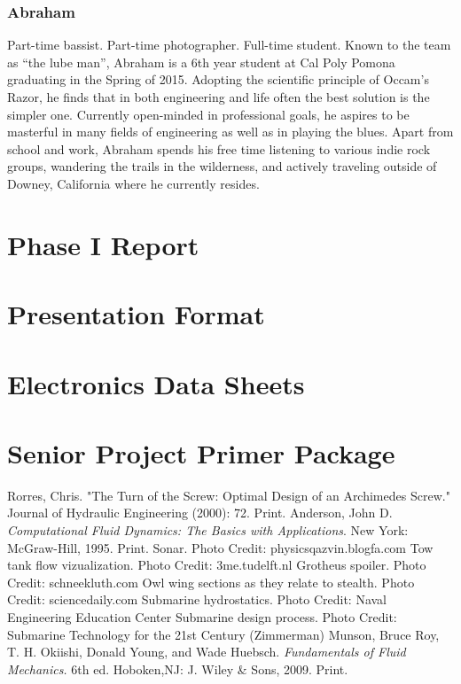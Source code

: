 \documentclass{report}
\begin{document}
\subsection{Abraham}
Part-time bassist.  Part-time photographer.  Full-time student.  Known to the team as “the lube man”, Abraham is a 6th year student at Cal Poly Pomona graduating in the Spring of 2015.  Adopting the scientific principle of Occam’s Razor, he finds that in both engineering and life often the best solution is the simpler one.  Currently open-minded in professional goals, he aspires to be masterful in many fields of engineering as well as in playing the blues.  Apart from school and work, Abraham spends his free time listening to various indie rock groups, wandering the trails in the wilderness, and actively traveling outside of Downey, California where he currently resides.
\appendix
\chapter{Phase I Report}

\chapter{Presentation Format}
\chapter{Electronics Data Sheets}

\chapter{Senior Project Primer Package}

\begin{thebibliography}{9}
Rorres, Chris. "The Turn of the Screw: Optimal Design of an Archimedes Screw." Journal of Hydraulic Engineering (2000): 72. Print.
Anderson, John D. \textit{Computational Fluid Dynamics: The Basics with Applications}. New York: McGraw-Hill, 1995. Print.
Sonar. Photo Credit: physicsqazvin.blogfa.com
Tow tank flow vizualization. Photo Credit: 3me.tudelft.nl
Grotheus spoiler. Photo Credit: schneekluth.com
Owl wing sections as they relate to stealth. Photo Credit: sciencedaily.com
Submarine hydrostatics. Photo Credit: Naval Engineering Education Center
Submarine design process. Photo Credit: Submarine Technology for the 21st Century (Zimmerman) 
Munson, Bruce Roy, T. H. Okiishi, Donald Young, and Wade Huebsch. \textit{Fundamentals of Fluid Mechanics.} 6th ed. Hoboken,NJ: J. Wiley \& Sons, 2009. Print.
\end{thebibliography}
\end{document}
